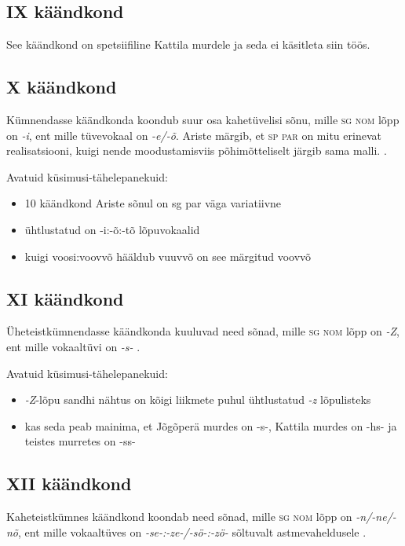 \documentclass[12pt,a4paper]{article}
\newcommand{\vadja}[1]{\textit{#1}}
\newcommand{\msd}[1]{\textsc{#1}}
\begin{document}
\subsection{\RN{9} käändkond}
See käändkond on spetsiifiline Kattila murdele ja seda ei käsitleta siin töös.


\subsection{\RN{10} käändkond}

Kümnendasse käändkonda koondub suur osa kahetüvelisi sõnu, mille \msd{sg nom} lõpp on \vadja{-i}, ent mille tüvevokaal on \vadja{-e/-õ}. Ariste märgib, et \msd{sp par} on mitu erinevat realisatsiooni, kuigi nende moodustamis\-viis põhimõtteliselt järgib sama malli. \cite[47]{ariste_grammar_1968}.

Avatuid küsimusi-tähelepanekuid:
\begin{itemize}
\item 10 käändkond Ariste sõnul on sg par väga variatiivne
\item ühtlustatud on -i:-õ:-tõ lõpuvokaalid
\item kuigi voosi:voovvõ hääldub vuuvvõ on see märgitud voovvõ
\end{itemize}


\subsection{\RN{11} käändkond}

Üheteistkümnendasse käändkonda kuuluvad need sõnad, mille \msd{sg nom} lõpp on \vadja{-Z}, ent mille vokaaltüvi on \vadja{-s-} \cite[48]{ariste_grammar_1968}.

Avatuid küsimusi-tähelepanekuid:
\begin{itemize}
\item \vadja{-Z}-lõpu sandhi nähtus on kõigi liikmete puhul ühtlustatud \vadja{-z} lõpulisteks
\item kas seda peab mainima, et Jõgõperä murdes on -s-, Kattila murdes on -hs- ja teistes murretes on -ss-
\end{itemize}


\subsection{\RN{12} käändkond}

Kaheteistkümnes käändkond koondab need sõnad, mille \msd{sg nom} lõpp on \vadja{-n/-ne/-nõ}, ent mille vokaaltüves on \vadja{-se-:-ze-/-sö-:-zö-} sõltuvalt astmevaheldusele \cite[49]{ariste_grammar_1968}.
\end{document}
